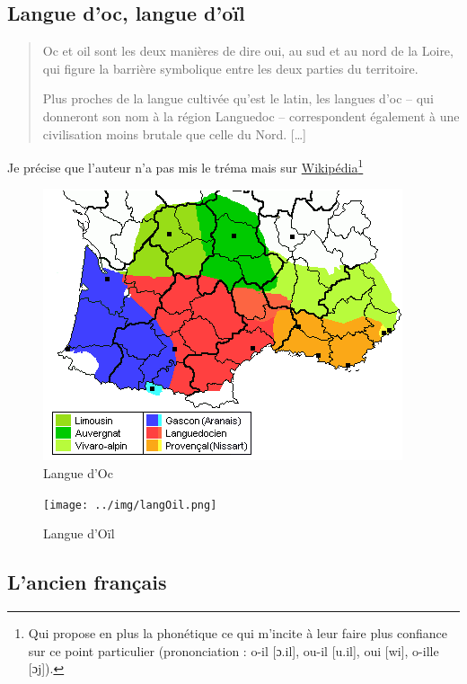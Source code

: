\subsection{Langue d'oc, langue d'oïl}\label{subsec:langOcOil}

\begin{quotation}
  Oc et oil sont les deux manières de dire oui, au sud et au nord de
  la Loire, qui figure la barrière symbolique entre les deux parties
  du territoire.\par
  Plus proches de la langue cultivée qu'est le latin, les langues d'oc
  -- qui donneront son nom à la région Languedoc -- correspondent
  également à une civilisation moins brutale que celle du Nord. [\dots]
\end{quotation}

Je précise que l'auteur n'a pas mis le tréma mais sur
\href{https://fr.wikipedia.org/wiki/Langue_d\%27o\%C3\%AFl}{Wikipédia}\footnote{Qui propose en plus la phonétique ce qui m'incite à
  leur faire plus confiance sur ce point particulier (prononciation :
  o-il [ɔ.il], ou-il [u.il], oui [wi], o-ille [ɔj]).}


\begin{subfigures}
  \label{fig:fig4a5}
  \begin{figure}
    \centering
    \includegraphics[scale=.725]{../img/langOc.png}
    \caption{Langue d'Oc}
    \label{fig:fig4}
  \end{figure}
  \begin{figure}
    \centering
    \texttt{[image: ../img/langOil.png]}
    \caption{Langue d'Oïl}
    \label{fig:fig5}
  \end{figure}
\end{subfigures}

\subsection{L'ancien français}\label{subsec:ancienfr}

